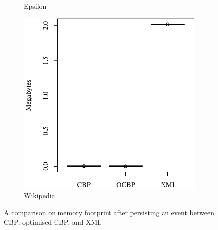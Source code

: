 \documentclass{beamer}
\begin{document}
\begin{frame}[fragile]
\begin{figure}
\begin{subfigure}{0.325\textwidth}
        \caption{Epsilon}
        \label{fig:save_memory_epsilon}
    \end{subfigure}
    \hfill
    \begin{subfigure}{0.325\textwidth}
        \centering
        \includegraphics[width=\linewidth]{save_memory_wikipedia}
        \caption{Wikipedia}
        \label{fig:save_memory_wikipedia}
    \end{subfigure}
    \caption{A comparison on memory footprint after persisting an event between CBP, optimised CBP, and XMI.}
    \label{fig:savememory}
\end{figure}
\end{frame}
\end{document}
